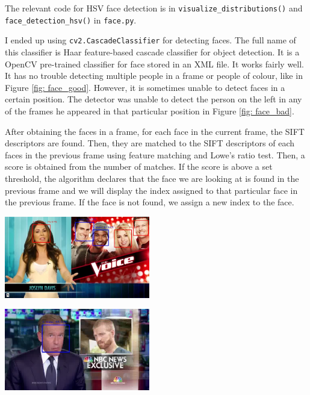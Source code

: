 \documentclass{article}
\begin{document}
The relevant code for HSV face detection is in \texttt{visualize\_distributions()} and \texttt{face\_detection\_hsv()} in \texttt{face.py}.

I ended up using \texttt{cv2.CascadeClassifier} for detecting faces. The full name of this classifier is Haar feature-based cascade classifier for object detection. It is a OpenCV pre-trained classifier for face stored in an XML file. It works fairly well. It has no trouble detecting multiple people in a frame or people of colour, like in Figure \ref{fig: face_good}. However, it is sometimes unable to detect faces in a certain position. The detector was unable to detect the person on the left in any of the frames he appeared in that particular position in Figure \ref{fig: face_bad}.

After obtaining the faces in a frame, for each face in the current frame, the SIFT descriptors are found. Then, they are matched to the SIFT descriptors of each faces in the previous frame using feature matching and Lowe's ratio test. Then, a score is obtained from the number of matches. If the score is above a set threshold, the algorithm declares that the face we are looking at is found in the previous frame and we will display the index assigned to that particular face in the previous frame. If the face is not found, we assign a new index to the face.

\vspace*{10pt}
\begin{minipage}{0.5\linewidth}
 \label{fig: face_good}
\centering
\includegraphics[width=2.5in]{../output/clip_2/069.jpg}
\end{minipage}
\begin{minipage}{0.5\linewidth}
 \label{fig: face_bad}
\centering
\includegraphics[width=2.5in]{../output/clip_1_face/110.jpg}
\end{minipage}
\vspace*{10pt}
\end{document}
